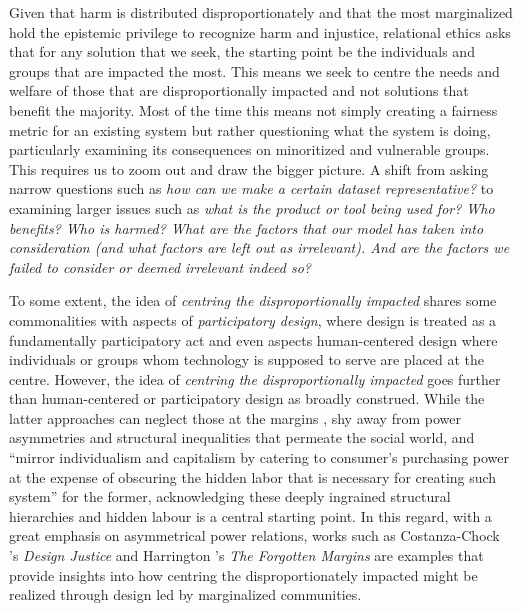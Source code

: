 Given that harm is distributed disproportionately and that the most marginalized hold the epistemic privilege to recognize harm and injustice, relational ethics asks that for any solution that we seek, the starting point be the individuals and groups that are impacted the most. This means we seek to centre the needs and welfare of those that are disproportionally impacted and not solutions that benefit the majority. Most of the time this means not simply creating a fairness metric for an existing system but rather questioning what the system is doing, particularly examining its consequences on minoritized and vulnerable groups. This requires us to zoom out and draw the bigger picture. A shift from asking narrow questions such as \textit{how can we make a certain dataset representative?} to examining larger issues such as \textit{what is the product or tool being used for? Who benefits? Who is harmed? What are the factors that our model has taken into consideration (and what factors are left out as irrelevant). And are the factors we failed to consider or deemed irrelevant indeed so?} 

To some extent, the idea of \textit{centring the disproportionally impacted} shares some commonalities with aspects of \textit{participatory design}, where design is treated as a fundamentally participatory act \cite{slavin2016design} and even aspects human-centered design \cite{irani2010postcolonial} where individuals or groups whom technology is supposed to serve are placed at the centre. However, the idea of \textit{centring the disproportionally impacted} goes further than human-centered or participatory design as broadly construed. While the latter approaches can neglect those at the margins \cite{harrington2020forgotten}, shy away from power asymmetries and structural inequalities that permeate the social world, and ``mirror individualism and capitalism by catering to consumer's purchasing power at the expense of obscuring the hidden labor that is necessary for creating such system'' \cite{Lioyd2020} for the former, acknowledging these deeply ingrained structural hierarchies and hidden labour is a central starting point. In this regard, with a great emphasis on asymmetrical power relations, works such as Costanza-Chock \cite{costanza2018design}'s \textit{Design Justice} and Harrington \cite{harrington2020forgotten}'s \textit{The Forgotten Margins} are examples that provide insights into how centring the disproportionately impacted might be realized through design led by marginalized communities. 

